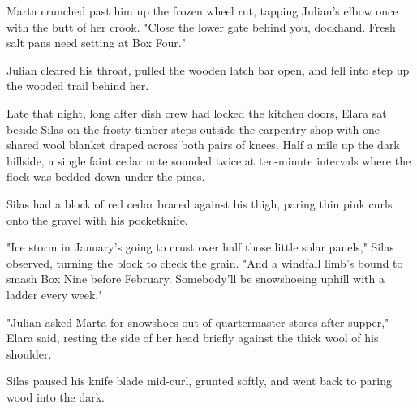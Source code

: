 Marta crunched past him up the frozen wheel rut, tapping Julian's elbow once with the butt of her crook. "Close the lower gate behind you, dockhand. Fresh salt pans need setting at Box Four."

Julian cleared his throat, pulled the wooden latch bar open, and fell into step up the wooded trail behind her.

\bigskip

Late that night, long after dish crew had locked the kitchen doors, Elara sat beside Silas on the frosty timber steps outside the carpentry shop with one shared wool blanket draped across both pairs of knees. Half a mile up the dark hillside, a single faint cedar note sounded twice at ten-minute intervals where the flock was bedded down under the pines.

Silas had a block of red cedar braced against his thigh, paring thin pink curls onto the gravel with his pocketknife.

"Ice storm in January's going to crust over half those little solar panels," Silas observed, turning the block to check the grain. "And a windfall limb's bound to smash Box Nine before February. Somebody'll be snowshoeing uphill with a ladder every week."

"Julian asked Marta for snowshoes out of quartermaster stores after supper," Elara said, resting the side of her head briefly against the thick wool of his shoulder.

Silas paused his knife blade mid-curl, grunted softly, and went back to paring wood into the dark.
